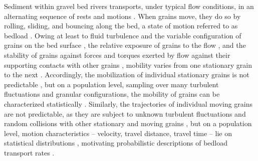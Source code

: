 \documentclass{article}
\begin{document}
Sediment within gravel bed rivers transports, under typical flow conditions, in an alternating sequence of rests and motions \citep{Einstein1937}. When grains move, they do so by rolling, sliding, and bouncing along the bed, a state of motion referred to as bedload \citep{Einstein1950, Bagnold1973, Church2006}. Owing at least to fluid turbulence and the variable configuration of grains on the bed surface \citep{Ferreira2015}, the relative exposure of grains to the flow \citep{Egiazaroff1965, McEwan2004}, and the stability of grains against forces and torques exerted by flow against their supporting contacts with other grains \citep{Coleman1967, Vowinckel2016a}, mobility varies from one stationary grain to the next \citep{Paintal1971, Celik2011, Vowinckel2016a}. Accordingly, the mobilization of individual stationary grains is not predictable \citep{Einstein1937}, but on a population level, sampling over many turbulent fluctuations and granular configurations, the mobility of grains can be characterized statistically \citep{Einstein1950, Yano1969a, Yang1971, Nakagawa1976, Dey2018}. Similarly, the trajectories of individual moving grains are not predictable, as they are subject to unknown turbulent fluctuations and random collisions with other stationary and moving grains \citep{Einstein1937, Wiberg1985, Bialik2015}, but on a population level, motion characteristics -- velocity, travel distance, travel time -- lie on statistical distributions \citep{Yano1969a, Yang1971, Nakagawa1976, Lajeunesse2010, Fathel2015, Heyman2016}, motivating probabilistic descriptions of bedload transport rates \citep{Einstein1950, Paintal1971, Nakagawa1976, Sun2000, Cheng2004, Ancey2008, Ma2014}.
\end{document}

